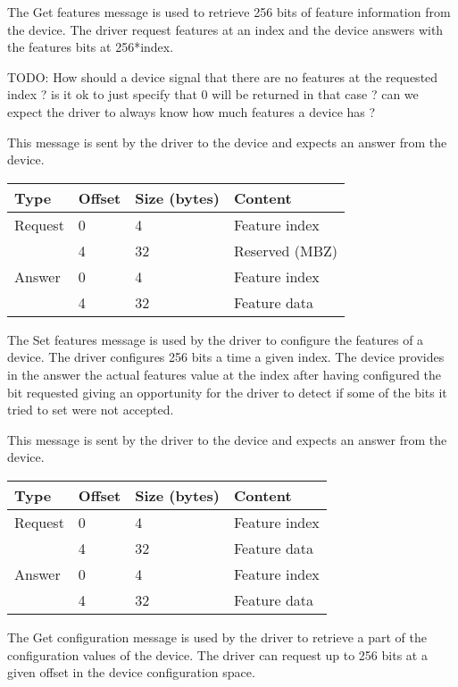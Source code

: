 The Get features message is used to retrieve 256 bits of feature information
from the device. The driver request features at an index and the device answers
with the features bits at 256*index.

TODO: How should a device signal that there are no features at the requested
 index ? is it ok to just specify that 0 will be returned in that case ? can
 we expect the driver to always know how much features a device has ?

This message is sent by the driver to the device and expects an answer from the
device.

\begin{tabular}{|l|l|l|l|}
\hline
Type & Offset & Size (bytes) & Content \\
\hline \hline
Request & 0 & 4 & Feature index \\
& 4 & 32 & Reserved (MBZ) \\
\hline
Answer & 0 & 4 & Feature index \\
& 4 & 32 & Feature data \\
\hline
\end{tabular}


The Set features message is used by the driver to configure the features of a
device. The driver configures 256 bits a time a given index. The device
provides in the answer the actual features value at the index after having
configured the bit requested giving an opportunity for the driver to detect if
some of the bits it tried to set were not accepted.

This message is sent by the driver to the device and expects an answer from the
device.

\begin{tabular}{|l|l|l|l|}
\hline
Type & Offset & Size (bytes) & Content \\
\hline \hline
Request & 0 & 4 & Feature index \\
& 4 & 32 & Feature data \\
\hline
Answer & 0 & 4 & Feature index \\
& 4 & 32 & Feature data \\
\hline
\end{tabular}


The Get configuration message is used by the driver to retrieve a part of the
configuration values of the device. The driver can request up to 256 bits at
a given offset in the device configuration space.


